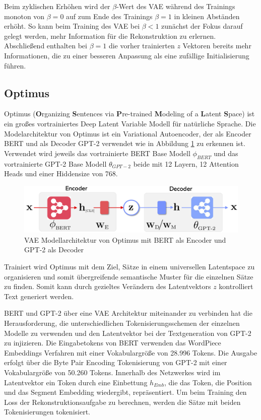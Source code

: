Beim zyklischen Erhöhen wird der $\beta$-Wert des VAE während des Trainings monoton von $\beta=0$ auf zum Ende des Trainings $\beta=1$ in kleinen Abständen erhöht.
So kann beim Training des VAE bei $\beta<1$ zunächst der Fokus darauf gelegt werden, mehr Information für die Rekonstruktion zu erlernen. 
Abschließend enthalten bei $\beta=1$ die vorher trainierten $z$ Vektoren bereits mehr Informationen, die zu einer besseren Anpassung als eine zufällige Initialisierung führen.


\subsection{Optimus}
Optimus (\textbf{O}rganizing \textbf{S}entences via \textbf{P}re-trained \textbf{M}odeling of a \textbf{L}atent \textbf{S}pace) \citep{DBLP:journals/corr/abs-2004-04092} ist ein großes vortrainiertes Deep Latent Variable Modell für natürliche Sprache.
Die Modelarchitektur von Optimus ist ein Variational Autoencoder, der als Encoder BERT und als Decoder GPT-2 verwendet wie in Abbildung \ref{optimus_scheme_fig} zu erkennen ist. 
Verwendet wird jeweils das vortrainierte BERT Base Modell $\phi_{BERT}$ und das vortrainierte GPT-2 Base Modell $\theta_{GPT-2}$ beide mit 12 Layern, 12 Attention Heads und einer Hiddensize von 768. 
\begin{figure}[h]
    \centering
    \includegraphics[width=\textwidth]{bilder/optimus_scheme}
    \caption{VAE Modellarchitektur von Optimus mit BERT als Encoder und GPT-2 als Decoder \citep{DBLP:journals/corr/abs-2004-04092}}
    \label{optimus_scheme_fig}
\end{figure}
Trainiert wird Optimus mit dem Ziel, Sätze in einem universellen Latentspace zu organisieren und somit übergreifende semantische Muster für die einzelnen Sätze zu finden.
Somit kann durch gezieltes Verändern des Latentvektors $z$ kontrolliert Text generiert werden. %

BERT und GPT-2 über eine VAE Architektur miteinander zu verbinden hat die Herausforderung, die unterschiedlichen Tokenisierungsschemen der einzelnen Modelle zu verwenden und den Latentvektor bei der Textgeneration von GPT-2 zu injizieren. 
Die Eingabetokens von BERT verwenden das WordPiece Embeddings Verfahren \citep{wordpiece} mit einer Vokabulargröße von 28.996 Tokens. 
Die Ausgabe erfolgt über die Byte Pair Encoding Tokenisierung \citep{bytepairencoding} von GPT-2 mit einer Vokabulargröße von 50.260 Tokens. 
Innerhalb des Netzwerkes wird im Latentvektor ein Token durch eine Einbettung $h_{Emb}$, die das Token, die Position und das Segment Embedding wiedergibt, repräsentiert.
Um beim Training den Loss der Rekonstruktionsaufgabe zu berechnen, werden die Sätze mit beiden Tokenisierungen tokenisiert.


